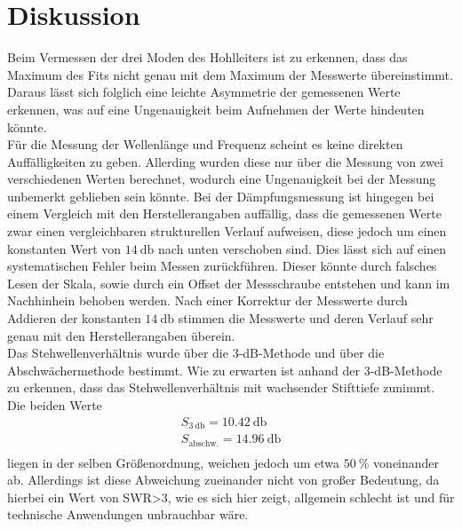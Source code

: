 \section{Diskussion}
\label{sec:Diskussion}

Beim Vermessen der drei Moden des Hohlleiters ist zu erkennen, dass das Maximum des Fits nicht genau mit dem Maximum der Messwerte übereinstimmt.
Daraus lässt sich folglich eine leichte Asymmetrie der gemessenen Werte erkennen, was auf eine Ungenauigkeit beim Aufnehmen der Werte hindeuten könnte.
\\
Für die Messung der Wellenlänge und Frequenz scheint es keine direkten Auffälligkeiten zu geben. Allerding wurden diese nur über die Messung von zwei verschiedenen Werten berechnet, wodurch eine Ungenauigkeit bei der Messung unbemerkt geblieben sein könnte. 
Bei der Dämpfungsmessung ist 
hingegen bei einem Vergleich mit den Herstellerangaben auffällig, dass die gemessenen Werte zwar einen vergleichbaren strukturellen Verlauf 
aufweisen, diese jedoch um einen konstanten Wert von $\SI{14}{\decibel}$ nach unten verschoben sind. Dies lässt sich auf einen systematischen 
Fehler beim Messen zurückführen. Dieser könnte durch falsches Lesen der Skala, sowie durch ein Offset der Messschraube entstehen und kann im Nachhinhein behoben werden. Nach einer Korrektur der Messwerte durch Addieren der konstanten $\SI{14}{\decibel}$ stimmen die Messwerte und 
deren Verlauf sehr genau mit den Herstellerangaben überein. 
\\
Das Stehwellenverhältnis wurde über die 3-dB-Methode und über die Abschwächermethode bestimmt. Wie zu erwarten ist anhand der 3-dB-Methode zu erkennen, 
dass das Stehwellenverhältnis mit wachsender Stifttiefe zunimmt. 
Die beiden Werte 
\begin{align*}
    S_{\SI{3}{\decibel}} = \SI{10.42}{\decibel} \\
    S_{\text{abschw.}} = \SI{14.96}{\decibel} \\
\end{align*}
liegen in der selben Größenordnung, weichen jedoch um etwa $\SI{50}{\percent}$ voneinander ab. 
Allerdings ist diese Abweichung zueinander nicht von großer Bedeutung, da hierbei ein Wert von SWR>3, wie es sich hier zeigt, allgemein schlecht ist und für 
technische Anwendungen unbrauchbar wäre.